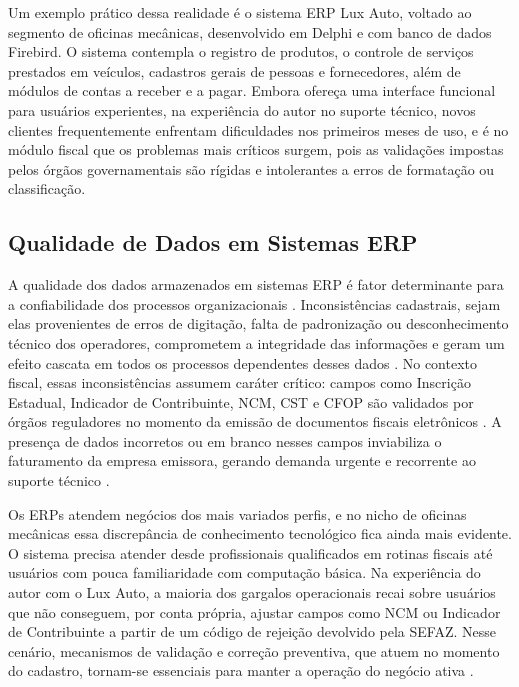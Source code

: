 Um exemplo prático dessa realidade é o sistema ERP Lux Auto, voltado ao segmento de oficinas mecânicas, desenvolvido em Delphi e com banco de dados Firebird. O sistema contempla o registro de produtos, o controle de serviços prestados em veículos, cadastros gerais de pessoas e fornecedores, além de módulos de contas a receber e a pagar. Embora ofereça uma interface funcional para usuários experientes, na experiência do autor no suporte técnico, novos clientes frequentemente enfrentam dificuldades nos primeiros meses de uso, e é no módulo fiscal que os problemas mais críticos surgem, pois as validações impostas pelos órgãos governamentais são rígidas e intolerantes a erros de formatação ou classificação.

\subsection{Qualidade de Dados em Sistemas ERP}

A qualidade dos dados armazenados em sistemas ERP é fator determinante para a confiabilidade dos processos organizacionais \cite{xu2002}. Inconsistências cadastrais, sejam elas provenientes de erros de digitação, falta de padronização ou desconhecimento técnico dos operadores, comprometem a integridade das informações e geram um efeito cascata em todos os processos dependentes desses dados \cite{krishna2024}. No contexto fiscal, essas inconsistências assumem caráter crítico: campos como Inscrição Estadual, Indicador de Contribuinte, NCM, CST e CFOP são validados por órgãos reguladores no momento da emissão de documentos fiscais eletrônicos \cite{brasil2020moc}. A presença de dados incorretos ou em branco nesses campos inviabiliza o faturamento da empresa emissora, gerando demanda urgente e recorrente ao suporte técnico \cite{Mehta2025ERPDataQuality}.

Os ERPs atendem negócios dos mais variados perfis, e no nicho de oficinas mecânicas essa discrepância de conhecimento tecnológico fica ainda mais evidente. O sistema precisa atender desde profissionais qualificados em rotinas fiscais até usuários com pouca familiaridade com computação básica. Na experiência do autor com o Lux Auto, a maioria dos gargalos operacionais recai sobre usuários que não conseguem, por conta própria, ajustar campos como NCM ou Indicador de Contribuinte a partir de um código de rejeição devolvido pela SEFAZ. Nesse cenário, mecanismos de validação e correção preventiva, que atuem no momento do cadastro, tornam-se essenciais para manter a operação do negócio ativa \cite{Schelter2018DQVerify}.

